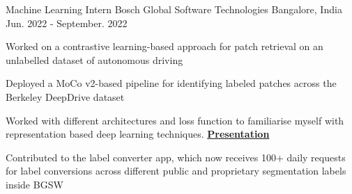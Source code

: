 

\begin{cventries}

  \cventry
    {Machine Learning Intern} %
    {Bosch Global Software Technologies} %
    {Bangalore, India} %
    {Jun. 2022 - September. 2022} %
    {
      \begin{cvitems} %
      \item{Worked on a contrastive learning-based approach for patch retrieval on an unlabelled dataset of autonomous driving}
      \item{Deployed a MoCo v2-based pipeline for identifying labeled patches across the Berkeley DeepDrive dataset}
      \item{Worked with different architectures and loss function to familiarise myself with representation based deep learning techniques. \href{https://docs.google.com/presentation/d/1wAB37q0hW6Y5Qfz5sY9cZwgJjKuUQsmOWMh0wMF9U88/edit?usp=sharing}{\bf Presentation}}
      \item{Contributed to the label converter app, which now receives 100+ daily requests for label conversions across different public and proprietary segmentation labels inside BGSW}
      \end{cvitems}
    }


\end{cventries}

